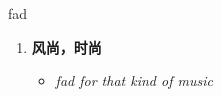 
\begin{frame}
{\huge fad}
\begin{center}
\begin{enumerate}\Large
  \item \textbf{风尚，时尚}
  \begin{itemize}
    \item \em{\Large{fad for that kind of music}}
  \end{itemize}
\end{enumerate}
\end{center}
\end{frame}
